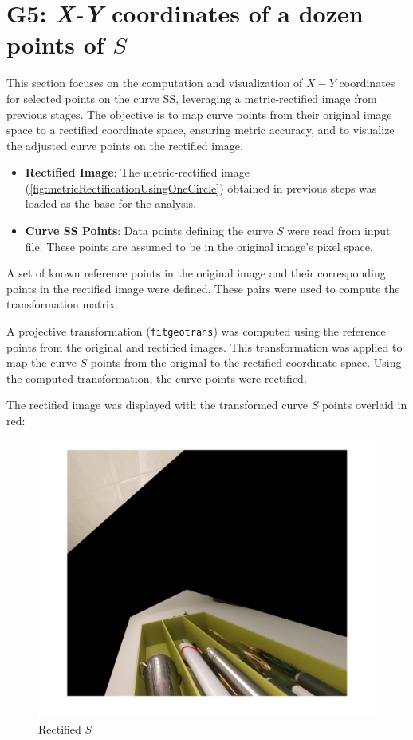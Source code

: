 \section[G5: \textit{X-Y} coordinates of a dozen points of \textit{S}]{G5: \textit{X-Y} coordinates of a dozen points of $S$}
This section focuses on the computation and visualization of $X-Y$ coordinates for selected points on the curve SS, leveraging a metric-rectified image from previous stages. The objective is to map curve points from their original image space to a rectified coordinate space, ensuring metric accuracy, and to visualize the adjusted curve points on the rectified image.

\begin{itemize}
    \item \textbf{Rectified Image}: The metric-rectified image (\ref{fig:metricRectificationUsingOneCircle}) obtained in previous steps was loaded as the base for the analysis.
    \item \textbf{Curve SS Points}: Data points defining the curve $S$ were read from input file. These points are assumed to be in the original image's pixel space.
\end{itemize}

A set of known reference points in the original image and their corresponding points in the rectified image were defined. These pairs were used to compute the transformation matrix.

A projective transformation (\texttt{fitgeotrans}) was computed using the reference points from the original and rectified images. This transformation was applied to map the curve $S$ points from the original to the rectified coordinate space. Using the computed transformation, the curve points were rectified.

The rectified image was displayed with the transformed curve $S$ points overlaid in red:

\begin{figure}[H]
    \centering
    \includegraphics[width=0.7\linewidth]{img/G5/G5_horizontal_metric_rectified_with_S.jpg}
    \caption{Rectified $S$}
    \label{fig:rectifedS}
\end{figure}

